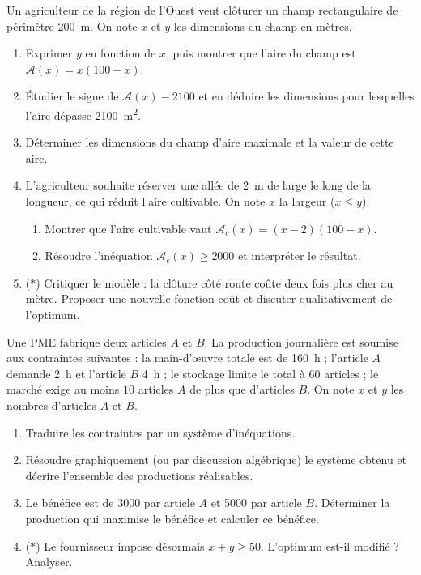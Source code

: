 \documentclass[11pt]{article}
\def\star{\mathbin{\ast}}\def\bigstar{\mathord{\ast}}%
\begin{document}
\begin{exercice}
Un agriculteur de la région de l'Ouest veut clôturer un champ rectangulaire de périmètre \SI{200}{\meter}. On note $x$ et $y$ les dimensions du champ en mètres.
\begin{enumerate}
\item Exprimer $y$ en fonction de $x$, puis montrer que l'aire du champ est $\mathcal{A}(x) = x(100 - x)$.
\item Étudier le signe de $\mathcal{A}(x) - 2100$ et en déduire les dimensions pour lesquelles l'aire dépasse \SI{2100}{\meter\squared}.
\item Déterminer les dimensions du champ d'aire maximale et la valeur de cette aire.
\item L'agriculteur souhaite réserver une allée de \SI{2}{\meter} de large le long de la longueur, ce qui réduit l'aire cultivable. On note $x$ la largeur ($x \leq y$).
\begin{enumerate}
\item Montrer que l'aire cultivable vaut $\mathcal{A}_c(x) = (x-2)(100-x)$.
\item Résoudre l'inéquation $\mathcal{A}_c(x) \geq 2000$ et interpréter le résultat.
\end{enumerate}
\item ($\star$) Critiquer le modèle : la clôture côté route coûte deux fois plus cher au mètre. Proposer une nouvelle fonction coût et discuter qualitativement de l'optimum.
\end{enumerate}
\end{exercice}

\begin{exercice}
Une PME fabrique deux articles $A$ et $B$. La production journalière est soumise aux contraintes suivantes : la main-d'œuvre totale est de \SI{160}{\hour} ; l'article $A$ demande \SI{2}{\hour} et l'article $B$ \SI{4}{\hour} ; le stockage limite le total à $60$ articles ; le marché exige au moins $10$ articles $A$ de plus que d'articles $B$. On note $x$ et $y$ les nombres d'articles $A$ et $B$.
\begin{enumerate}
\item Traduire les contraintes par un système d'inéquations.
\item Résoudre graphiquement (ou par discussion algébrique) le système obtenu et décrire l'ensemble des productions réalisables.
\item Le bénéfice est de \SI{3000}{} par article $A$ et \SI{5000}{} par article $B$. Déterminer la production qui maximise le bénéfice et calculer ce bénéfice.
\item ($\star$) Le fournisseur impose désormais $x + y \geq 50$. L'optimum est-il modifié ? Analyser.
\end{enumerate}
\end{exercice}
\end{document}
